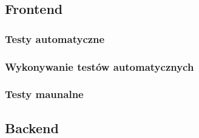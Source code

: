 \documentclass[12pt,a4paper]{article}
\begin{document}
\subsection{Frontend}
\subsubsection{Testy automatyczne}
\subsubsection{Wykonywanie testów automatycznych}
\subsubsection{Testy maunalne}

\newpage

\subsection{Backend}
\end{document}
